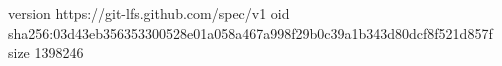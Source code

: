 version https://git-lfs.github.com/spec/v1
oid sha256:03d43eb356353300528e01a058a467a998f29b0c39a1b343d80dcf8f521d857f
size 1398246
